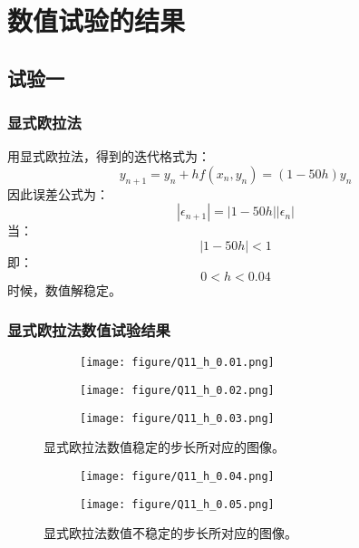 \documentclass{article}
\begin{document}
\section{数值试验的结果}
\subsection{试验一}
\subsubsection{显式欧拉法}
用显式欧拉法，得到的迭代格式为：
\begin{equation*}
    y_{n + 1} = y_{n} + hf(x_{n}, y_{n}) = (1 - 50h)y_{n}
\end{equation*}
因此误差公式为：
\begin{equation*}
    |\epsilon_{n + 1}| = |1 - 50h||\epsilon_{n}|
\end{equation*}
当：
\begin{equation*}
    |1 - 50h| < 1
\end{equation*}
即：
\begin{equation*}
    0 < h < 0.04
\end{equation*}
时候，数值解稳定。

\subsubsection{显式欧拉法数值试验结果}
\begin{figure*}[h]
    \begin{subfigure}[h]{0.3\textwidth}
        \centering
        \texttt{[image: figure/Q11\_h\_0.01.png]}
    \end{subfigure}
    \begin{subfigure}[h]{0.3\textwidth}
        \centering
        \texttt{[image: figure/Q11\_h\_0.02.png]}
    \end{subfigure}
    \begin{subfigure}[h]{0.3\textwidth}
        \centering
        \texttt{[image: figure/Q11\_h\_0.03.png]}
    \end{subfigure}
    \caption{显式欧拉法数值稳定的步长所对应的图像。}
    \label{fig:explicit-convergence}
\end{figure*}
\begin{figure*}[h]
    \centering
    \begin{subfigure}[h]{0.3\textwidth}
        \centering
        \texttt{[image: figure/Q11\_h\_0.04.png]}
    \end{subfigure}
    \centering
    \begin{subfigure}[h]{0.3\textwidth}
        \centering
        \texttt{[image: figure/Q11\_h\_0.05.png]}
    \end{subfigure}
    \caption{显式欧拉法数值不稳定的步长所对应的图像。}
    \label{fig:explicit-divergence}
\end{figure*}
\end{document}
